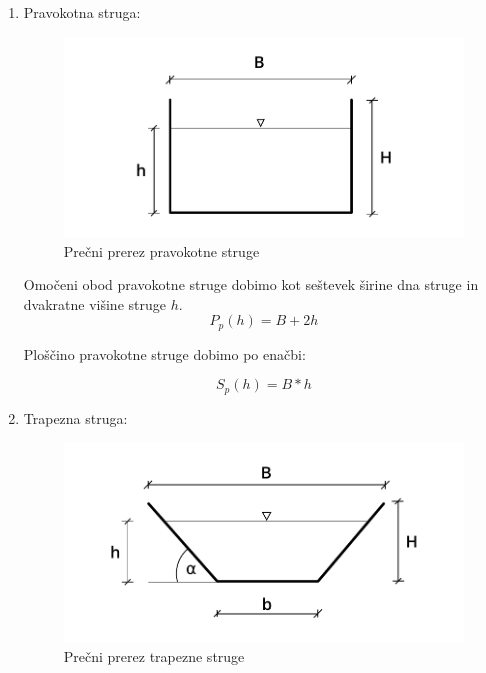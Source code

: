\begin{enumerate}
	\item Pravokotna struga:
	
	\begin{figure}[ht!]
		\begin{centering}
			\includegraphics{slike/konsumpcijska_krivulja/rectangularChannel.pdf}		
			\caption{Prečni prerez pravokotne struge}\label{fig:pravokotna struga}
		\end{centering}
	\end{figure}
	

	Omočeni obod pravokotne struge dobimo kot seštevek širine dna struge in dvakratne višine struge $h$.
	\begin{equation}
	P_{p}(h) = B + 2h
	\end{equation}
	
	Ploščino pravokotne struge dobimo po enačbi:
	
	\begin{equation}
	S_{p}(h) = B * h
	\end{equation}
	
	\item Trapezna struga:
	
		\begin{figure}[ht!]
			\begin{centering}
				\includegraphics{slike/konsumpcijska_krivulja/trapezoidChannel.pdf}		
				\caption{Prečni prerez trapezne struge}\label{fig:trapezna struga}
			\end{centering}
		\end{figure}
	

\end{enumerate}
